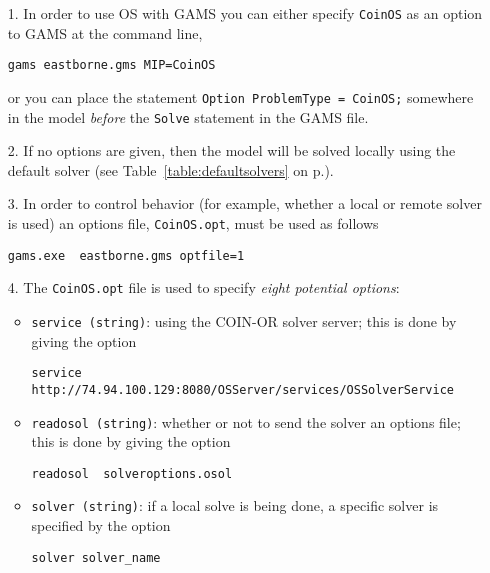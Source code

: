 \begin{enumerate}

\item[1.]   In order to use OS with GAMS you can either specify {\tt CoinOS} as an option to GAMS 
at the command line,
\begin{verbatim}
gams eastborne.gms MIP=CoinOS
\end{verbatim}
or you can  place the statement {\tt Option ProblemType = CoinOS;} somewhere in the model {\it before} 
the {\tt Solve} statement in the GAMS file.


\item[2.]   If no options are given, then the model will be solved locally using the default solver 
(see Table~\ref{table:defaultsolvers} on p.\pageref{table:defaultsolvers}).

\item[3.] In order to control behavior (for example, whether a local or remote solver is used)  an options
 file,  {\tt CoinOS.opt}, must be used as follows

\begin{verbatim}
gams.exe  eastborne.gms optfile=1
\end{verbatim}

\item[4.]  The  {\tt CoinOS.opt} file is used to specify {\it eight potential options}:


\begin{itemize}
\item {\tt service (string)}: using the COIN-OR solver server; this is done by giving the option

\begin{verbatim}
service  http://74.94.100.129:8080/OSServer/services/OSSolverService
\end{verbatim}


\item  {\tt readosol (string)}: whether or not to send the solver an options file; this is done by 
giving the option
\begin{verbatim}
readosol  solveroptions.osol
\end{verbatim}


\item   {\tt solver (string)}: if a local solve is being done,  a specific solver is specified by 
the option
\begin{verbatim}
solver solver_name
\end{verbatim}


\end{itemize}
\end{enumerate}
